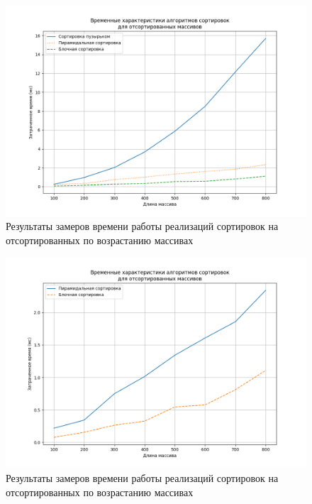 \begin{figure}[h]
	\includegraphics[scale=0.45]{img/sorted.png}
	\centering 
	\caption{Результаты замеров времени работы реализаций сортировок на отсортированных по возрастанию массивах}
	\label{img:sorted_all}
\end{figure}
\begin{figure}[h]
	\includegraphics[scale=0.45]{img/sorted_two.png}
	\centering 
	\caption{Результаты замеров времени работы реализаций сортировок на отсортированных по возрастанию массивах}
	\label{img:sorted_two}
\end{figure}
